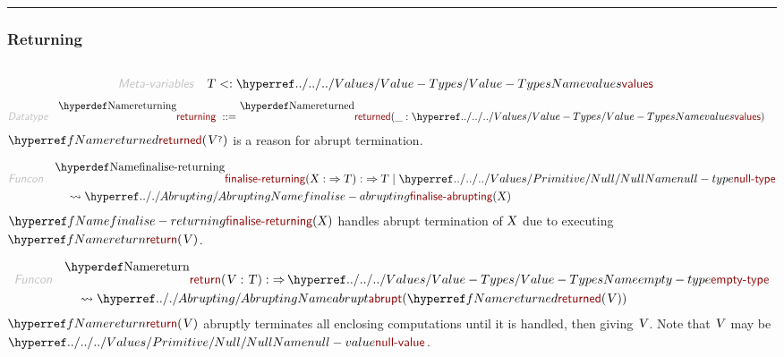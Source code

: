 

\begin{center}
\rule{3in}{0.4pt}
\end{center}

\subsubsection{Returning}\hypertarget{returning}{}\label{returning}

\begin{align*}
  [ \
  \KEY{Datatype} \quad & \NAMEREF{returning} \\
  \KEY{Funcon} \quad & \NAMEREF{returned} \\
  \KEY{Funcon} \quad & \NAMEREF{finalise-returning} \\
  \KEY{Funcon} \quad & \NAMEREF{return} \\
  \KEY{Funcon} \quad & \NAMEREF{handle-return}
  \ ]
\end{align*}
\begin{align*}
  \KEY{Meta-variables} \quad
  & \VAR{T} <: \NAMEHYPER{../../../Values}{Value-Types}{values}
\end{align*}
\begin{align*}
  \KEY{Datatype} \quad 
  \NAMEDECL{returning} 
  \ ::= \ & \NAMEDECL{returned}(
                               \_ : \NAMEHYPER{../../../Values}{Value-Types}{values})
\end{align*}
$\SHADE{\NAMEREF{returned}
           (  \VAR{V}\QUERY )}$ is a reason for abrupt termination.

\begin{align*}
  \KEY{Funcon} \quad
  & \NAMEDECL{finalise-returning}(
                       \VAR{X} :  \TO \VAR{T}) 
    :  \TO \VAR{T}  \mid \NAMEHYPER{../../../Values/Primitive}{Null}{null-type} \\&\quad
    \leadsto \NAMEHYPER{../.}{Abrupting}{finalise-abrupting}
               (  \VAR{X} )
\end{align*}
$\SHADE{\NAMEREF{finalise-returning}
           (  \VAR{X} )}$ handles abrupt termination of $\SHADE{\VAR{X}}$ due to
  executing $\SHADE{\NAMEREF{return}
           (  \VAR{V} )}$.

\begin{align*}
  \KEY{Funcon} \quad
  & \NAMEDECL{return}(
                       \VAR{V} : \VAR{T}) 
    :  \TO \NAMEHYPER{../../../Values}{Value-Types}{empty-type} \\&\quad
    \leadsto \NAMEHYPER{../.}{Abrupting}{abrupt}
               (  \NAMEREF{returned}
                       (  \VAR{V} ) )
\end{align*}
$\SHADE{\NAMEREF{return}
           (  \VAR{V} )}$ abruptly terminates all enclosing computations until it is
  handled, then giving $\SHADE{\VAR{V}}$. Note that $\SHADE{\VAR{V}}$ may be $\SHADE{\NAMEHYPER{../../../Values/Primitive}{Null}{null-value}}$.

